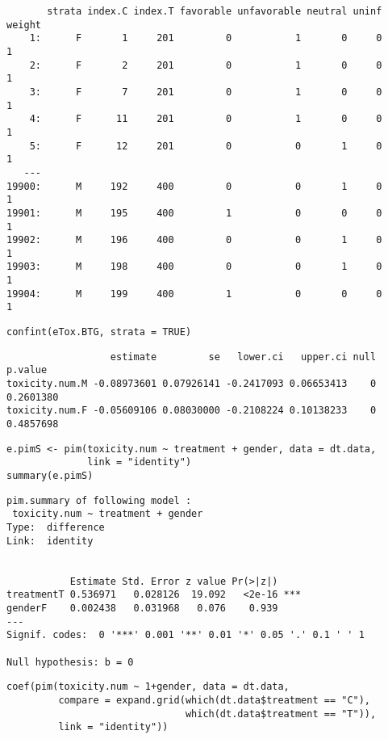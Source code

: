 \documentclass[12pt]{article}
\begin{document}
\begin{verbatim}
       strata index.C index.T favorable unfavorable neutral uninf weight
    1:      F       1     201         0           1       0     0      1
    2:      F       2     201         0           1       0     0      1
    3:      F       7     201         0           1       0     0      1
    4:      F      11     201         0           1       0     0      1
    5:      F      12     201         0           0       1     0      1
   ---                                                                  
19900:      M     192     400         0           0       1     0      1
19901:      M     195     400         1           0       0     0      1
19902:      M     196     400         0           0       1     0      1
19903:      M     198     400         0           0       1     0      1
19904:      M     199     400         1           0       0     0      1
\end{verbatim}


\lstset{language=r,label= ,caption= ,captionpos=b,numbers=none}
\begin{lstlisting}
confint(eTox.BTG, strata = TRUE)
\end{lstlisting}

\begin{verbatim}
                  estimate         se   lower.ci   upper.ci null   p.value
toxicity.num.M -0.08973601 0.07926141 -0.2417093 0.06653413    0 0.2601380
toxicity.num.F -0.05609106 0.08030000 -0.2108224 0.10138233    0 0.4857698
\end{verbatim}


\lstset{language=r,label= ,caption= ,captionpos=b,numbers=none}
\begin{lstlisting}
e.pimS <- pim(toxicity.num ~ treatment + gender, data = dt.data,
              link = "identity")
summary(e.pimS)
\end{lstlisting}

\begin{verbatim}
pim.summary of following model : 
 toxicity.num ~ treatment + gender
Type:  difference 
Link:  identity 


           Estimate Std. Error z value Pr(>|z|)    
treatmentT 0.536971   0.028126  19.092   <2e-16 ***
genderF    0.002438   0.031968   0.076    0.939    
---
Signif. codes:  0 '***' 0.001 '**' 0.01 '*' 0.05 '.' 0.1 ' ' 1

Null hypothesis: b = 0
\end{verbatim}

\lstset{language=r,label= ,caption= ,captionpos=b,numbers=none}
\begin{lstlisting}
coef(pim(toxicity.num ~ 1+gender, data = dt.data,
         compare = expand.grid(which(dt.data$treatment == "C"),
                               which(dt.data$treatment == "T")),
         link = "identity"))

\end{lstlisting}
\end{document}
